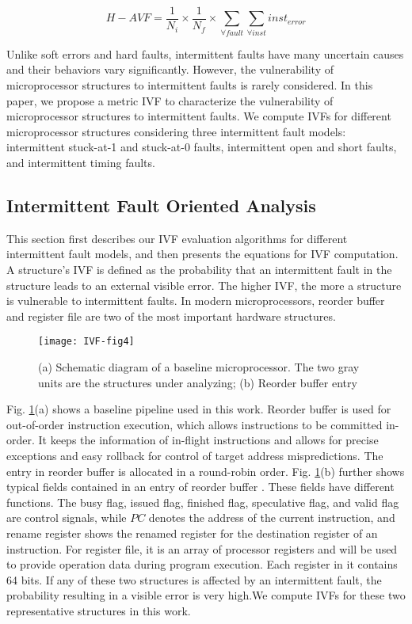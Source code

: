 \begin{equation} \label{eq:havf}
    H-AVF=\frac{1}{N_{i}} \times \frac{1}{N_{f}} \times \sum_{\forall fault}^{}\sum_{\forall inst}^{}inst_{error}
\end{equation}

Unlike soft errors and hard faults, intermittent faults have many uncertain causes and their behaviors vary significantly. However, the vulnerability of microprocessor structures to intermittent faults is rarely considered. In this paper, we propose a metric IVF to characterize the vulnerability of microprocessor structures to intermittent faults. We compute IVFs for different microprocessor structures considering three intermittent fault models: intermittent stuck-at-1 and stuck-at-0 faults, intermittent open and short faults, and intermittent timing faults.

\subsection{Intermittent Fault Oriented Analysis}
This section first describes our IVF evaluation algorithms for different intermittent fault models, and then presents the equations for IVF computation. A structure’s IVF is defined as the probability that an intermittent fault in the structure leads to an external visible error. The higher IVF, the more a structure is vulnerable to intermittent faults. In modern microprocessors, reorder buffer and register file are two of the most important hardware structures.

\begin{figure}[t]
    \centering
    \texttt{[image: IVF-fig4]}\\
    \caption{(a) Schematic diagram of a baseline microprocessor. The two gray units are the structures under analyzing; (b) Reorder buffer entry \cite{shen2013modern}}
    \label{fig:baseline-processor}
\end{figure}


Fig. \ref{fig:baseline-processor}(a) shows a baseline pipeline used in this work. Reorder buffer is used for out-of-order instruction execution, which allows instructions to be committed in-order. It keeps the information of in-flight instructions and allows for precise exceptions and easy rollback for control of target address mispredictions. The entry in reorder buffer is allocated in a round-robin order. Fig. \ref{fig:baseline-processor}(b) further shows typical fields contained in an entry of reorder buffer \cite{shen2013modern}. These fields have different functions. The busy flag, issued flag, finished flag, speculative flag, and valid flag are control signals, while $PC$ denotes the address of the current instruction, and rename register shows the renamed register for the destination register of an instruction. For register file, it is an array of processor registers and will be used to provide operation data during program execution. Each register in it contains 64 bits. If any of these two structures is affected by an intermittent fault, the probability resulting in a visible error is very high.We compute IVFs for these two representative structures in this work.


